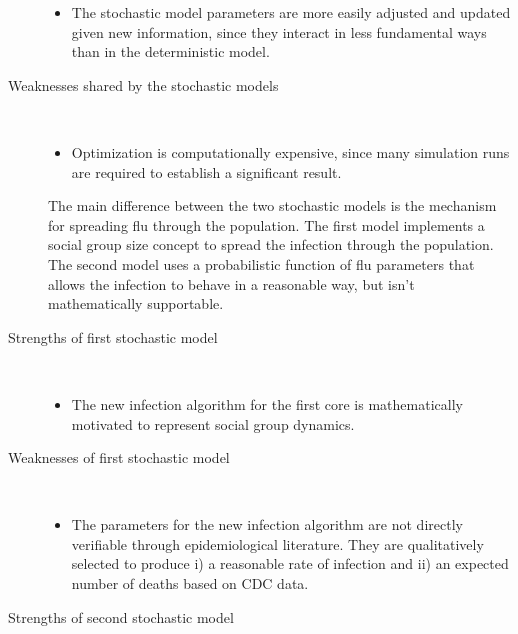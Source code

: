 \documentclass[titlepage]{article}
\begin{document}
\begin{description}
\begin{itemize}
\item The stochastic model parameters are more easily adjusted and updated given new information, since they interact in less fundamental ways than in the deterministic model.
\end{itemize}

 

\item[Weaknesses shared by the stochastic models]\hfill \\
\begin{itemize}

\item Optimization is computationally expensive, since many simulation runs are required to establish a significant result.

\end{itemize}

The main difference between the two stochastic models is the mechanism for spreading flu through the population. The first model implements a social group size concept to spread the infection through the population. The second model uses a probabilistic function of flu parameters that allows the infection to behave in a reasonable way, but isn't mathematically supportable.

 

\item[Strengths of first stochastic model]\hfill \\
\begin{itemize}
\item The new infection algorithm for the first core is mathematically motivated to represent social group dynamics.
\end{itemize}

 

\item[Weaknesses of first stochastic model]\hfill \\
\begin{itemize}

\item The parameters for the new infection algorithm are not directly verifiable through epidemiological literature. They are qualitatively selected to produce i) a reasonable rate of infection and ii) an expected number of deaths based on CDC data.

\end{itemize}

\item[Strengths of second stochastic model]\hfill \\


\end{description}
\end{document}
